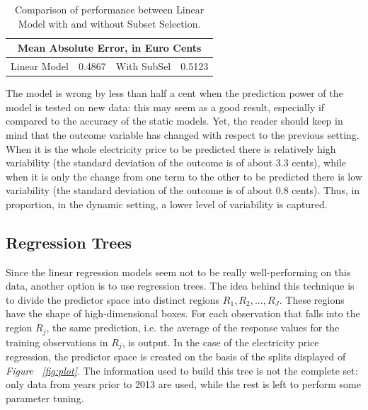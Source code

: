\documentclass[a4paper,12pt]{book}
\begin{document}
\begin{table}[tb]
\begin{center}
\begin{tabular}{|c|c|c|c|}
\hline
\multicolumn{4}{|c|}{Mean Absolute Error, in Euro Cents}\\
\hline
Linear Model&0.4867&With SubSel&0.5123\\
\hline
\end{tabular}
\caption{Comparison of performance between Linear Model with and without Subset Selection.}
\label{Tab:euro}
\end{center}
\end{table}

The model is wrong by less than half a cent when the prediction power of the model is tested on new data: this may seem as a good result, especially if compared to the accuracy of the static models. Yet, the reader should keep in mind that the outcome variable has changed with respect to the previous setting. When it is the whole electricity price to be predicted there is relatively high variability (the standard deviation of the outcome is of about 3.3 cents), while when it is only the change from one term to the other to be predicted there is low variability (the standard deviation of the outcome is of about 0.8 cents). Thus, in proportion, in the dynamic setting, a lower level of variability is captured.

\subsection{Regression Trees}

Since the linear regression models seem not to be really well-performing on this data, another option is to use regression trees. The idea behind this technique is to divide the predictor space into distinct regions $R_1, R_2, ..., R_J$. These regions have the shape of high-dimensional boxes. For each observation that falls into the region $R_j$, the same prediction, i.e. the average of the response values for the training observations in $R_j$, is output. In the case of the electricity price regression, the predictor space is created on the basis of the splits displayed of \textit{Figure ~\ref{fig:plot}}. The information used to build this tree is not the complete set: only data from years prior to 2013 are used, while the rest is left to perform some parameter tuning.
 
\end{document}
